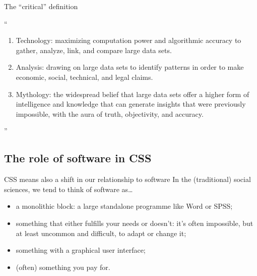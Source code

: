 \begin{frame}{The ``critical'' definition }
	\begin{block}{\textcite{boyd2012}}
		``
		\begin{enumerate}
			\item Technology: maximizing computation power and algorithmic accuracy to gather, analyze, link, and compare large data sets.
			\item Analysis: drawing on large data sets to identify patterns in order to make economic, social, technical, and legal claims.
			\item Mythology: the widespread belief that large data sets offer a higher form of intelligence and knowledge that can generate insights that were previously impossible, with the aura of truth, objectivity, and accuracy.
		\end{enumerate}
		''
	\end{block}
\end{frame}












\subsection{The role of software in CSS}

\begin{frame}{CSS means also a shift in our relationship to software}
	In the (traditional) social sciences, we tend to think of software as\ldots
\begin{itemize}
	\item a monolithic block: a large standalone programme like Word or SPSS;
	\item something that either fulfills your needs or doesn't: it's often impossible, but at least uncommon and difficult, to adapt or change it;
	\item something with a graphical user interface;
	\item (often) something you pay for.
\end{itemize}
\end{frame}



